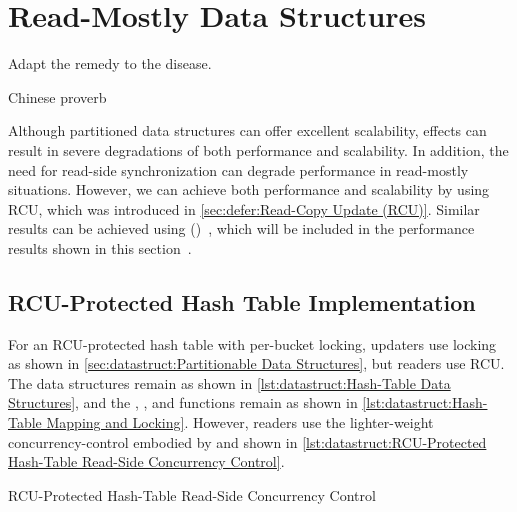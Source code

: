 \section{Read-Mostly Data Structures}
\label{sec:datastruct:Read-Mostly Data Structures}
%
\epigraph{Adapt the remedy to the disease.}{Chinese proverb}

Although partitioned data structures can offer excellent scalability,
 effects can result in severe degradations of both performance and
scalability.
In addition,
the need for read-side synchronization can degrade performance in
read-mostly situations.
However, we can achieve both performance and scalability by using
RCU, which was introduced in
\cref{sec:defer:Read-Copy Update (RCU)}.
Similar results can be achieved using 
()~\cite{MagedMichael04a}, which will be included in
the performance results shown in this
section~\cite{McKenney:2013:SDS:2483852.2483867}.

\subsection{RCU-Protected Hash Table Implementation}
\label{sec:datastruct:RCU-Protected Hash Table Implementation}

For an RCU-protected hash table with per-bucket locking,
updaters use locking as shown in
\cref{sec:datastruct:Partitionable Data Structures},
but readers use RCU\@.
The data structures remain as shown in
\cref{lst:datastruct:Hash-Table Data Structures},
and the , , and 
functions remain as shown in
\cref{lst:datastruct:Hash-Table Mapping and Locking}.
However, readers use the lighter-weight concurrency-control embodied
by  and 
shown in
\cref{lst:datastruct:RCU-Protected Hash-Table Read-Side Concurrency Control}.

\begin{listing}

\caption{RCU-Protected Hash-Table Read-Side Concurrency Control}
\label{lst:datastruct:RCU-Protected Hash-Table Read-Side Concurrency Control}
\end{listing}

